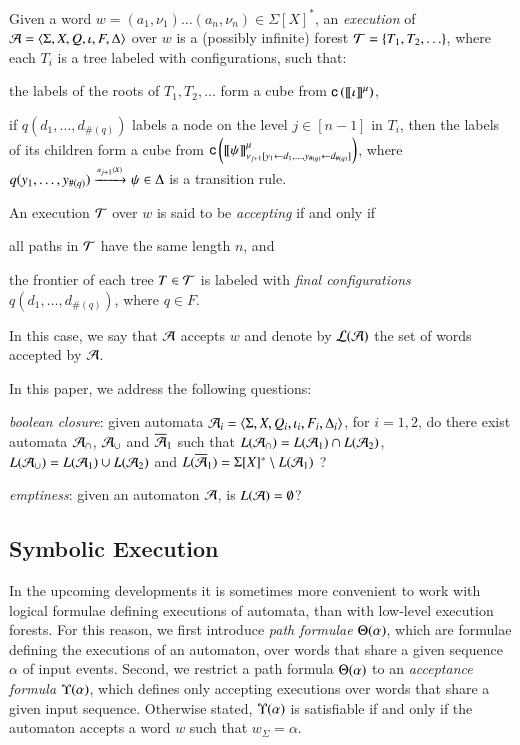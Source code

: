 \documentclass{llncs}
\begin{document}
Given a word $w=(a_1,\nu_1) \ldots (a_n,\nu_n) \in \Sigma[X]^*$, an
\emph{execution} of $\mathcal{A}=\langle \Sigma,X,Q,\iota,F,\Delta \rangle$ over $w$ is
a (possibly infinite) forest $\mathcal{T} = \{ T_1,T_2,\ldots \}$, where each
$T_i$ is a tree labeled with configurations, such that:
\begin{compactitem}
\item the labels of the roots of $T_1, T_2, \ldots$ form a cube from
  $\mathsf{c}\left({{\bf [\![} \iota {\bf ]\!]}^\mu}\right)$,
%
\item if $q(d_1,\ldots,d_{\#(q)})$ labels a node on the level $j \in
  [n-1]$ in $T_i$, then the labels of its children form a cube from
  $\mathsf{c}\left({{\bf [\![} \psi {\bf ]\!]}^\mu_{\nu_{j+1}[y_1 \leftarrow d_1,\ldots,y_{\#(q)}
        \leftarrow d_{\#(q)}]}}\right)$, where \(q(y_1,\ldots,y_{\#(q)})
  \xrightarrow{{\scriptscriptstyle a_{j+1}(X)}}_{{\scriptstyle }} \psi \in \Delta\) is a transition rule.
\end{compactitem}
An execution $\mathcal{T}$ over $w$ is said to be \emph{accepting} if and only
if \begin{inparaenum}[(i)]
\item all paths in $\mathcal{T}$ have the same length $n$, and
\item the frontier of each tree $T \in \mathcal{T}$ is labeled with \emph{final
  configurations} $q(d_1,\ldots,d_{\#(q)})$, where $q \in F$.
\end{inparaenum} In this case, we say that $\mathcal{A}$ accepts $w$ and
denote by ${\mathcal L}({\mathcal{A}})$ the set of words accepted by $\mathcal{A}$. 

In this paper, we address the following questions: \begin{compactenum}
\item \emph{boolean closure}: given automata $\mathcal{A}_i =
  \langle \Sigma,X,Q_i,\iota_i,F_i,\Delta_i \rangle$, for $i=1,2$, do there
  exist automata $\mathcal{A}_\cap$, $\mathcal{A}_\cup$ and $\overline{\mathcal{A}}_1$ such that
  $L(\mathcal{A}_\cap) = L(\mathcal{A}_1) \cap L(\mathcal{A}_2)$, $L(\mathcal{A}_\cup) = L(\mathcal{A}_1) \cup
  L(\mathcal{A}_2)$ and $L(\overline{\mathcal{A}}_1) = \Sigma[X]^* \setminus L(\mathcal{A}_1)$ ?
%
\item \emph{emptiness}: given an automaton $\mathcal{A}$, is $L(\mathcal{A}) =
  \emptyset$?
\end{compactenum}

\subsection{Symbolic Execution}

In the upcoming developments it is sometimes more convenient to work
with logical formulae defining executions of automata, than with
low-level execution forests. For this reason, we first introduce
\emph{path formulae} $\Theta({\alpha})$, which are formulae defining
the executions of an automaton, over words that share a given sequence
$\alpha$ of input events.  Second, we restrict a path formula
$\Theta({\alpha})$ to an \emph{acceptance formula}
$\Upsilon({\alpha})$, which defines only accepting executions over words
that share a given input sequence. Otherwise stated,
$\Upsilon({\alpha})$ is satisfiable if and only if the automaton accepts
a word $w$ such that $w_\Sigma = \alpha$.
\end{document}
